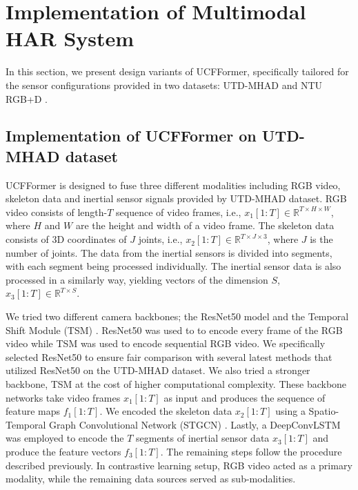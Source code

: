 \section{Implementation of Multimodal HAR System}
In this section, we present design variants of UCFFormer, specifically tailored for the sensor configurations provided in two datasets: UTD-MHAD \cite{chen2015utd} and NTU RGB+D \cite{shahroudy2016ntu}.

\subsection{Implementation of UCFFormer on UTD-MHAD dataset}
UCFFormer is designed to fuse three different modalities including RGB video,  skeleton data and inertial sensor signals provided by UTD-MHAD dataset.  RGB video consists of length-$T$ sequence of video frames, i.e.,  $x_{1}[1:T] \in \mathbb{R}^{T \times H \times W}$, where $H$ and $W$ are the height and width of a video frame. The skeleton data  consists of 3D coordinates of $J$ joints, i.e., $x_{2}[1:T] \in \mathbb{R}^{T \times J \times 3}$, where $J$ is the number of joints. The data from the inertial sensors is divided into segments, with each segment being processed individually. The inertial sensor data is also processed in a similarly way, yielding vectors of the dimension $S$,  $x_{3}[1:T] \in \mathbb{R}^{T \times S}$.

We tried two different camera backbones; the ResNet50 model and  the Temporal Shift Module (TSM) \cite{lin2019tsm}. ResNet50 was used to to encode every frame of the RGB video while TSM was used to encode sequential RGB video.  We specifically selected ResNet50 to ensure fair comparison with several latest methods \cite{imran2016human,liu2018rgb,islam2020hamlet,islam2022mumu} that utilized ResNet50 on the UTD-MHAD dataset. We also tried a stronger backbone, TSM at the cost of higher computational complexity.  These backbone networks take video frames $x_1[1:T]$ as input and produces the sequence of feature maps $f_1[1:T]$. We encoded the skeleton data $x_2[1:T]$ using a Spatio-Temporal Graph Convolutional Network (STGCN) \cite{yu2018spatio}. Lastly, a DeepConvLSTM \cite{singh2020deep} was employed to encode the $T$ segments of inertial sensor data $x_{3}[1:T]$ and produce the feature vectors $f_{3}[1:T]$. 
The remaining steps follow the procedure described previously. 
In contrastive learning setup, RGB video acted as a primary modality, while the remaining data sources served as sub-modalities.


